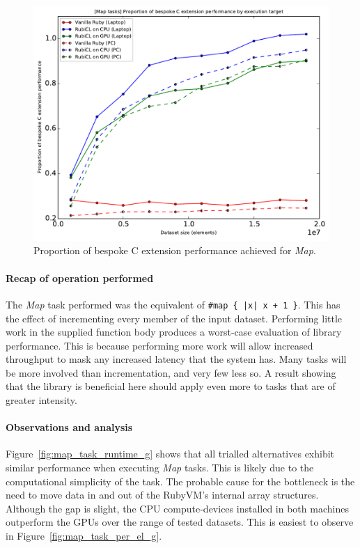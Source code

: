 \begin{figure}[H]

  \includegraphics[width=\textwidth]{./graphing/just_map/prop_bes.pdf}
  \caption{Proportion of bespoke C extension performance achieved for \emph{Map}.}
  \label{fig:map_task_bperf_g}
\end{figure}
\paragraph*{Recap of operation performed}
The \emph{Map} task performed was the equivalent of \verb!#map { |x| x + 1 }!. This has the effect of incrementing every member of the input dataset.
Performing little work in the supplied function body produces a worst-case evaluation of library performance. This is because performing more work will allow increased throughput to mask any increased latency that the system has. Many tasks will be more involved than incrementation, and very few less so. A result showing that the library is beneficial here should apply even more to tasks that are of greater intensity.

\paragraph*{Observations and analysis}
Figure~\ref{fig:map_task_runtime_g} shows that all trialled alternatives exhibit similar performance when executing \emph{Map} tasks.
This is likely due to the computational simplicity of the task. The probable cause for the bottleneck is the need to move data in and out of the RubyVM's internal array structures.
Although the gap is slight, the \ac{CPU} compute-devices installed in both machines outperform the \acp{GPU} over the range of tested datasets. This is easiest to observe in Figure~\ref{fig:map_task_per_el_g}.

